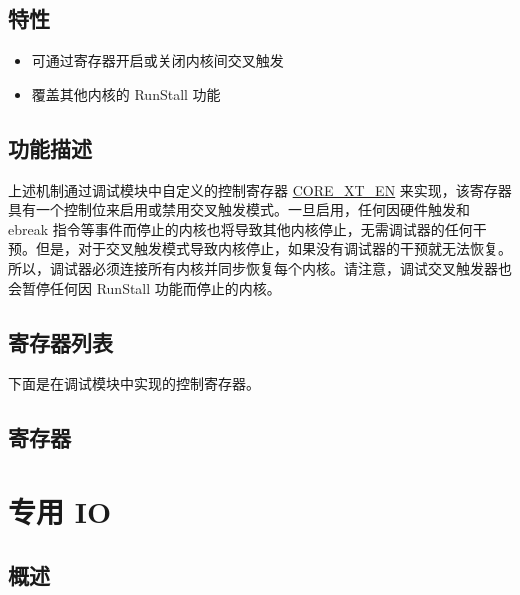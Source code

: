 \documentclass[main\_\_CN.tex]{subfiles}
\begin{document}
\subsection{特性}
\label{sec:riscvcpu-cti-features}
 \begin{itemize}
    \item 可通过寄存器开启或关闭内核间交叉触发
    \item 覆盖其他内核的 RunStall 功能
\end{itemize}

\subsection{功能描述}
\label{sec:riscvcpu-cti-func-descr}

上述机制通过调试模块中自定义的控制寄存器 \hyperref[regdesc:CTI_EN]{CORE\_XT\_EN} 来实现，该寄存器具有一个控制位来启用或禁用交叉触发模式。一旦启用，任何因硬件触发和 ebreak 指令等事件而停止的内核也将导致其他内核停止，无需调试器的任何干预。但是，对于交叉触发模式导致内核停止，如果没有调试器的干预就无法恢复。所以，调试器必须连接所有内核并同步恢复每个内核。请注意，调试交叉触发器也会暂停任何因 RunStall 功能而停止的内核。


\clearpage
\hypertarget{riscvcpu-cti-reg-summ}{}
\subsection{寄存器列表}
\label{sec:riscvcpu-cti-reg-summ}

下面是在调试模块中实现的控制寄存器。




\subsection{寄存器}
\label{sec:riscvcpu-cti-reg-desc}



\clearpage
\section{专用 IO}
\label{sec:riscvcpu-fastio}

\subsection{概述}
\label{sec:riscvcpu-fastio-overview}
\end{document}
